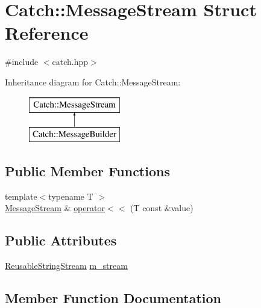 \hypertarget{struct_catch_1_1_message_stream}{}\section{Catch\+:\+:Message\+Stream Struct Reference}
\label{struct_catch_1_1_message_stream}


{\ttfamily \#include $<$catch.\+hpp$>$}

Inheritance diagram for Catch\+:\+:Message\+Stream\+:\begin{figure}[H]
\begin{center}
\leavevmode
\includegraphics[height=2.000000cm]{struct_catch_1_1_message_stream}
\end{center}
\end{figure}
\subsection*{Public Member Functions}
\begin{DoxyCompactItemize}
\item 
{\footnotesize template$<$typename T $>$ }\\\mbox{\hyperlink{struct_catch_1_1_message_stream}{Message\+Stream}} \& \mbox{\hyperlink{struct_catch_1_1_message_stream_a554c4aff5925a077e9fe9d858217428d}{operator$<$$<$}} (T const \&value)
\end{DoxyCompactItemize}
\subsection*{Public Attributes}
\begin{DoxyCompactItemize}
\item 
\mbox{\hyperlink{class_catch_1_1_reusable_string_stream}{Reusable\+String\+Stream}} \mbox{\hyperlink{struct_catch_1_1_message_stream_a9202520faed8882ef469db9f353ec578}{m\+\_\+stream}}
\end{DoxyCompactItemize}


\subsection{Member Function Documentation}
\mbox{\label{struct_catch_1_1_message_stream_a554c4aff5925a077e9fe9d858217428d}} 
